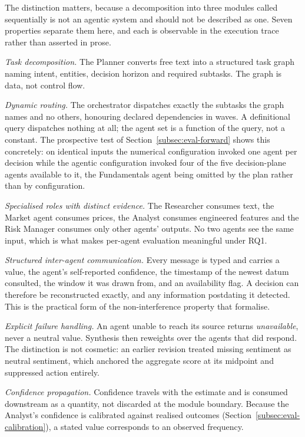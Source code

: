 \documentclass[pdflatex,sn-apa]{sn-jnl}%
\theoremstyle{thmstyleone}%
\theoremstyle{thmstyletwo}%
\theoremstyle{thmstylethree}%
\begin{document}
The distinction matters, because a decomposition into three modules called
sequentially is not an agentic system and should not be described as one. Seven
properties separate them here, and each is observable in the execution trace
rather than asserted in prose.

\emph{Task decomposition.} The Planner converts free text into a structured
task graph naming intent, entities, decision horizon and required subtasks. The
graph is data, not control flow.

\emph{Dynamic routing.} The orchestrator dispatches exactly the subtasks the
graph names and no others, honouring declared dependencies in waves. A
definitional query dispatches nothing at all; the agent set is a function of the
query, not a constant. The prospective test of
Section~\ref{subsec:eval-forward} shows this concretely: on identical inputs the
numerical configuration invoked one agent per decision while the agentic
configuration invoked four of the five decision-plane agents available to it,
the Fundamentals agent being omitted by the plan rather than by configuration.

\emph{Specialised roles with distinct evidence.} The Researcher consumes text,
the Market agent consumes prices, the Analyst consumes engineered features and
the Risk Manager consumes only other agents' outputs. No two agents see the
same input, which is what makes per-agent evaluation meaningful under RQ1.

\emph{Structured inter-agent communication.} Every message is typed and carries
a value, the agent's self-reported confidence, the timestamp of the newest datum
consulted, the window it was drawn from, and an availability flag. A decision
can therefore be reconstructed exactly, and any information postdating it
detected. This is the practical form of the non-interference property that
\citet{fonseca2026lookahead} formalise.

\emph{Explicit failure handling.} An agent unable to reach its source returns
\emph{unavailable}, never a neutral value. Synthesis then reweights over the
agents that did respond. The distinction is not cosmetic: an earlier revision
treated missing sentiment as neutral sentiment, which anchored the aggregate
score at its midpoint and suppressed action entirely.

\emph{Confidence propagation.} Confidence travels with the estimate and is
consumed downstream as a quantity, not discarded at the module boundary. Because
the Analyst's confidence is calibrated against realised outcomes
(Section~\ref{subsec:eval-calibration}), a stated value corresponds to an
observed frequency.
\end{document}
